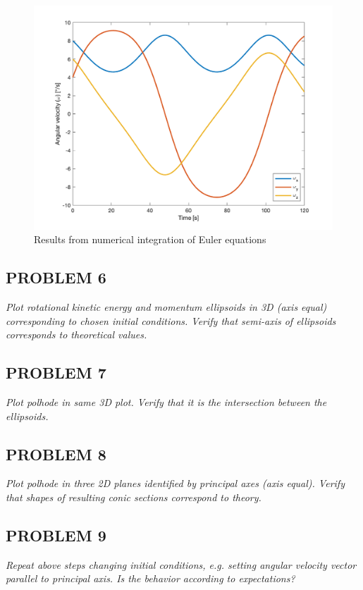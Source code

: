 \begin{figure}[H]
\centering
\includegraphics[scale=0.7]{Images/ps2_euler_equations.png}
\caption{Results from numerical integration of Euler equations}
\label{fig:ps2_euler_equations}
\end{figure}


\subsection{PROBLEM 6}
\textit{Plot rotational kinetic energy and momentum ellipsoids in 3D (axis equal) corresponding to chosen initial conditions. Verify that semi-axis of ellipsoids corresponds to theoretical values.}


\subsection{PROBLEM 7}
\textit{Plot polhode in same 3D plot. Verify that it is the intersection between the ellipsoids.}


\subsection{PROBLEM 8}
\textit{Plot polhode in three 2D planes identified by principal axes (axis equal). Verify that shapes of resulting conic sections correspond to theory.}



\subsection{PROBLEM 9}
\textit{Repeat above steps changing initial conditions, e.g. setting angular velocity vector parallel to principal axis. Is the behavior according to expectations?}
